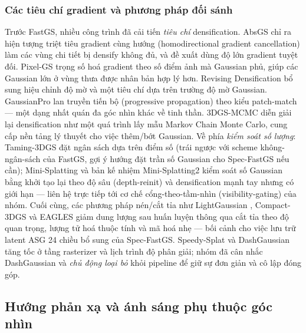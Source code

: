         \subsubsection{Các tiêu chí gradient và phương pháp đối sánh}
        Trước FastGS, nhiều công trình đã cải tiến \textit{tiêu chí} densification.
        AbsGS \cite{absgs} chỉ ra hiện tượng triệt tiêu gradient cùng hướng
        (homodirectional gradient cancellation) làm các vùng chi tiết bị densify
        không đủ, và đề xuất dùng độ lớn gradient tuyệt đối. Pixel-GS \cite{pixelgs}
        trọng số hoá gradient theo số điểm ảnh mà Gaussian phủ, giúp các Gaussian
        lớn ở vùng thưa được nhân bản hợp lý hơn. Revising Densification
        \cite{revisedens} bổ sung hiệu chỉnh độ mờ và một tiêu chí dựa trên trường
        độ mờ Gaussian. GaussianPro \cite{gaussianpro} lan truyền tiến bộ
        (progressive propagation) theo kiểu patch-match — một dạng nhất quán đa góc
        nhìn khác về tinh thần. 3DGS-MCMC \cite{mcmc} diễn giải lại densification
        như một quá trình lấy mẫu Markov Chain Monte Carlo, cung cấp nền tảng lý
        thuyết cho việc thêm/bớt Gaussian. Về phía \textit{kiểm soát số lượng}:
        Taming-3DGS \cite{taming3dgs} đặt ngân sách dựa trên điểm số (trái ngược với
        scheme không-ngân-sách của FastGS, gợi ý hướng đặt trần số Gaussian cho
        Spec-FastGS nếu cần); Mini-Splatting \cite{minisplatting} và bản kế nhiệm
        Mini-Splatting2 \cite{minisplatting2} kiểm soát số Gaussian bằng khởi tạo
        lại theo độ sâu (depth-reinit) và densification mạnh tay nhưng có giới hạn —
        liên hệ trực tiếp tới cơ chế cổng-theo-tầm-nhìn (visibility-gating) của
        nhóm. Cuối cùng, các phương pháp nén/cắt tỉa như LightGaussian
        \cite{lightgaussian}, Compact-3DGS \cite{compact3d} và EAGLES \cite{eagles}
        giảm dung lượng sau huấn luyện thông qua cắt tỉa theo độ quan trọng, lượng
        tử hoá thuộc tính và mã hoá nhẹ — bối cảnh cho việc lưu trữ latent ASG
        24 chiều bổ sung của Spec-FastGS. Speedy-Splat \cite{speedysplat} và
        DashGaussian \cite{dashgs} tăng tốc ở tầng rasterizer và lịch trình độ phân
        giải; nhóm đã cân nhắc DashGaussian và \textit{chủ động loại bỏ} khỏi
        pipeline để giữ sự đơn giản và cô lập đóng góp.

    \subsection{Hướng phản xạ và ánh sáng phụ thuộc góc nhìn}
